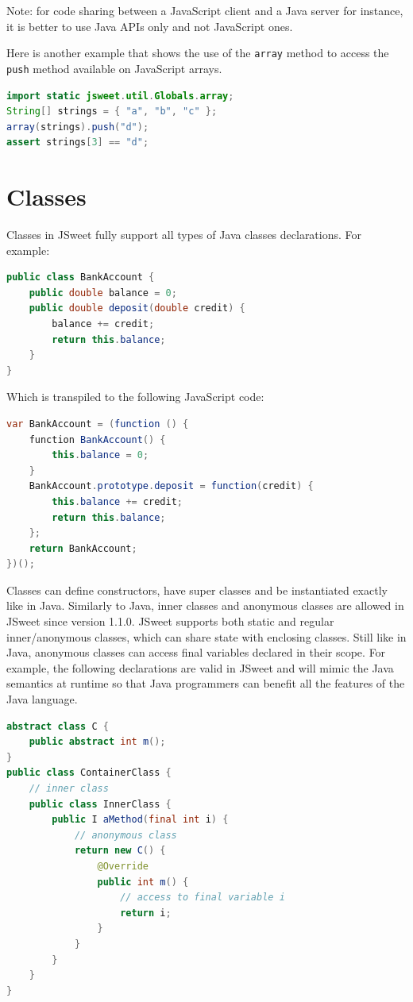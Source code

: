 \documentclass[a4paper]{report}
\begin{document}
Note: for code sharing between a JavaScript client and a Java server for instance, it is better to use Java APIs only and not JavaScript ones.

\noindent
Here is another example that shows the use of the \texttt{array} method to access the \texttt{push} method available on JavaScript arrays.

\begin{lstlisting}[language=Java]
import static jsweet.util.Globals.array;
String[] strings = { "a", "b", "c" };
array(strings).push("d");
assert strings[3] == "d";
\end{lstlisting}

\section{Classes}

Classes in JSweet fully support all types of Java classes declarations. For example:

\begin{lstlisting}[language=Java]
public class BankAccount {  
    public double balance = 0;  
    public double deposit(double credit) {  
        balance += credit;  
        return this.balance;  
    }  
}  
\end{lstlisting}

\noindent
Which is transpiled to the following JavaScript code:

\begin{lstlisting}[language=Java]
var BankAccount = (function () {  
    function BankAccount() {  
        this.balance = 0;  
    }  
    BankAccount.prototype.deposit = function(credit) {  
        this.balance += credit;  
        return this.balance;  
    };  
    return BankAccount;  
})();
\end{lstlisting}

Classes can define constructors, have super classes and be instantiated exactly like in Java. Similarly to Java, inner classes and anonymous classes are allowed in JSweet since version 1.1.0. JSweet supports both static and regular inner/anonymous classes, which can share state with enclosing classes. Still like in Java, anonymous classes can access final variables declared in their scope. For example, the following declarations are valid in JSweet and will mimic the Java semantics at runtime so that Java programmers can benefit all the features of the Java language.

\begin{lstlisting}[language=Java]
abstract class C {
	public abstract int m();
}
public class ContainerClass {
	// inner class
	public class InnerClass {
		public I aMethod(final int i) {
			// anonymous class
			return new C() {
				@Override
				public int m() {
					// access to final variable i
					return i;
				}
			}
		}    
	}
}
\end{lstlisting}
\end{document}
